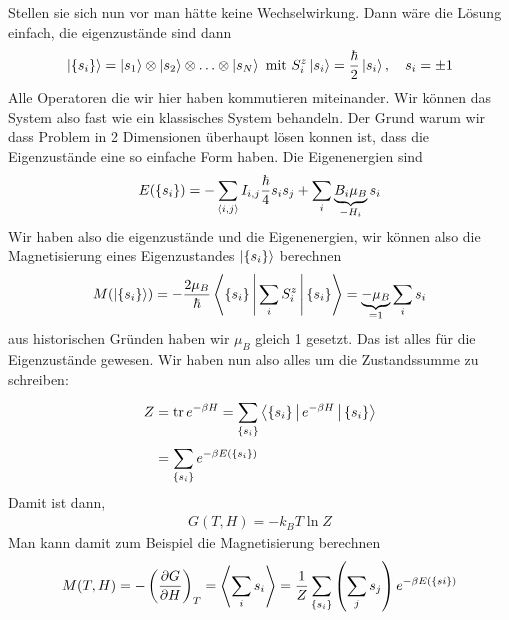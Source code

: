\begin{description}
        Stellen sie sich nun vor man hätte keine Wechselwirkung. Dann wäre
        die Lösung einfach, die eigenzustände sind dann
        \begin{align*}
          \Ket{\{s_i\}} = \Ket{s_1} \otimes \Ket{s_2} \otimes \ldots \otimes
          \Ket{s_N} \text{ mit } S_i^z \Ket{s_i} = \frac{\hbar}{2}
          \Ket{s_i}, \quad s_i = \pm 1
        \end{align*}
        Alle Operatoren die wir hier haben kommutieren miteinander. Wir können
        das System also fast wie ein klassisches System behandeln. Der Grund
        warum wir dass Problem in 2 Dimensionen überhaupt lösen konnen ist,
        dass die Eigenzustände eine so einfache Form haben. Die Eigenenergien sind
        \begin{align*}
          E(\{s_i\}) = -  \sum_{\Braket{i,j}}^{} I_{i,j} \frac{\hbar}{4}
          s_i s_j + \sum_{i}^{} \underbrace{B_i \mu_B}_{- H_i} s_i
        \end{align*}
        Wir haben also die eigenzustände und die Eigenenergien, wir können
        also die Magnetisierung eines Eigenzustandes $\Ket{\{s_i\}}$ berechnen
        \begin{align*}
          M(\Ket{\{s_i\}}) = - \frac{2 \mu_B}{\hbar} \Braket{\{s_i\}
            | \sum_{i}^{} S_i^z | \{s_i\}} = \underbrace{- \mu_B}_{=1} \sum_{i}^{} s_i
        \end{align*}
        aus historischen Gründen haben wir $\mu_B$ gleich 1 gesetzt. Das ist 
        alles für die Eigenzustände gewesen. Wir haben nun also 
        alles um die Zustandssumme zu schreiben:
        \begin{align*}
          Z & = \operatorname{tr} e^{-\beta H}  = \sum_{\{s_i\}}^{} 
          \Braket{\{s_i\} | e^{-\beta H} | \{s_i\}} \\
          & = \sum_{\{s_i\}}^{} e ^{-\beta E (\{s_i\})}
        \end{align*}
        Damit ist dann,
        \begin{align*}
          G(T, H) = - k_B T \ln{Z} 
        \end{align*}
        Man kann damit zum Beispiel die Magnetisierung berechnen
        \begin{align*}
          M(T, H) = - \left( \frac{\partial G }{\partial H} \right)_T = 
          \Braket{ \sum_{i}^{} s_i} = 
          \frac{1}{Z} \sum_{\{s_i\}}^{} \left( \sum_{j}^{} s_j \right)
          e^{-\beta E(\{si\})}
        \end{align*}

\end{description}
